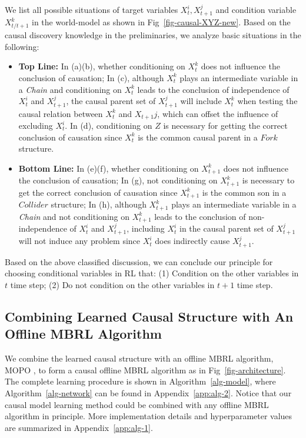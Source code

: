 \documentclass{article}
\theoremstyle{plain}
\theoremstyle{definition}
\theoremstyle{remark}
\begin{document}
We list all possible situations of target variables $X_t^i,X_{t+1}^j$ and condition variable $X_{t/t+1}^k$ in the world-model as shown in Fig~\ref{fig-causal-XYZ-new}.
Based on the causal discovery knowledge in the preliminaries, we analyze basic situations in the following:
\begin{itemize}[leftmargin=5mm]
    \item \textbf{Top Line:} In (a)(b), whether conditioning on $X_t^k$ does not influence the conclusion of causation;
    In (c), although $X_t^k$ plays an intermediate variable in a \textit{Chain} and conditioning on $X_t^k$ leads to the conclusion of independence of $X_t^i$ and $X_{t+1}^j$, the causal parent set of $X_{t+1}^j$ will include $X_t^k$ when testing the causal relation between $X_t^k$ and $X_{t+1}j$, which can offset the influence of excluding $X_t^i$.
    In (d), conditioning on $Z$ is necessary for getting the correct conclusion of causation since $X_t^k$ is the common causal parent in a $\textit{Fork}$ structure. 
    \item \textbf{Bottom Line:} In (e)(f), whether conditioning on $X_{t+1}^k$ does not influence the conclusion of causation;
    In (g), not conditioning on $X_{t+1}^k$ is necessary to get the correct conclusion of causation since $X_{t+1}^k$ is the common son in a $\textit{Collider}$ structure;
    In (h), although $X_{t+1}^k$ plays an intermediate variable in a \textit{Chain} and not conditioning on $X_{t+1}^k$ leads to the conclusion of non-independence of $X_t^i$ and $X_{t+1}^j$, including $X_t^i$ in the causal parent set of $X_{t+1}^j$ will not induce any problem since $X_t^i$ does indirectly cause $X_{t+1}^j$.
\end{itemize}
Based on the above classified discussion, we can conclude our principle for choosing conditional variables in RL that: (1) Condition on the other variables in $t$ time step; (2) Do not condition on the other variables in $t+1$ time step.



\subsection{Combining Learned Causal Structure with An Offline MBRL Algorithm}

We combine the learned causal structure with an offline MBRL algorithm, MOPO \cite{mopo}, to form a causal offline MBRL algorithm as in Fig~\ref{fig-architecture}.
The complete learning procedure is shown in Algorithm~\ref{alg-model}, where Algorithm~\ref{alg-network} can be found in Appendix~\ref{app:alg-2}. 
Notice that our causal model learning method could be combined with any offline MBRL algorithm in principle.
More implementation details and hyperparameter values are summarized in Appendix~\ref{app:alg-1}.
\end{document}
